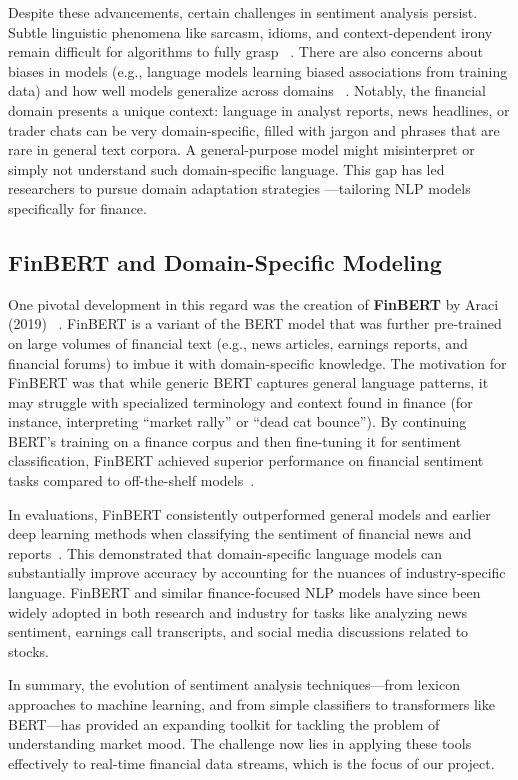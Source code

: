 \documentclass[12pt]{article}
\begin{document}
Despite these advancements, certain challenges in sentiment analysis persist. Subtle linguistic phenomena
like sarcasm, idioms, and context-dependent irony remain difficult for algorithms to fully grasp~
\cite{SentimentEmotionSurvey2021}. There are also concerns about biases in models (e.g., language models
learning biased associations from training data) and how well models generalize across domains~
\cite{SentimentEmotionSurvey2021}. Notably, the financial domain presents a unique context: language in
analyst reports, news headlines, or trader chats can be very domain-specific, filled with jargon and phrases
that are rare in general text corpora. A general-purpose model might misinterpret or simply not understand
such domain-specific language. This gap has led researchers to pursue domain adaptation strategies
---tailoring NLP models specifically for finance.

\subsection{FinBERT and Domain-Specific Modeling}
One pivotal development in this regard was the creation of \textbf{FinBERT} by Araci (2019)~
\cite{araci2019finbert}. FinBERT is a variant of the BERT model that was further pre-trained on large volumes
of financial text (e.g., news articles, earnings reports, and financial forums) to imbue it with
domain-specific knowledge. The motivation for FinBERT was that while generic BERT captures general language
patterns, it may struggle with specialized terminology and context found in finance (for instance,
interpreting ``market rally'' or ``dead cat bounce''). By continuing BERT's training on a finance corpus and
then fine-tuning it for sentiment classification, FinBERT achieved superior performance on financial
sentiment tasks compared to off-the-shelf models~\cite{araci2019finbert}.

In evaluations, FinBERT consistently outperformed general models and earlier deep learning methods when
classifying the sentiment of financial news and reports~\cite{araci2019finbert}. This demonstrated that
domain-specific language models can substantially improve accuracy by accounting for the nuances of
industry-specific language. FinBERT and similar finance-focused NLP models have since been widely adopted in
both research and industry for tasks like analyzing news sentiment, earnings call transcripts, and social
media discussions related to stocks.

In summary, the evolution of sentiment analysis techniques---from lexicon approaches to machine learning, and
from simple classifiers to transformers like BERT---has provided an expanding toolkit for tackling the
problem of understanding market mood. The challenge now lies in applying these tools effectively to real-time
financial data streams, which is the focus of our project.
\end{document}
